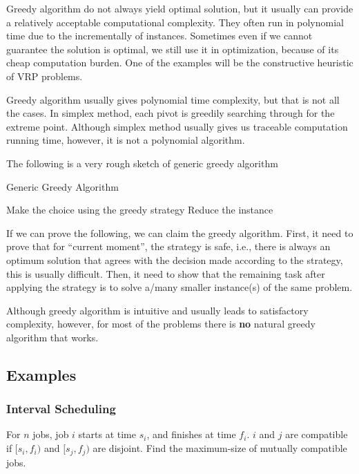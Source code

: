 					Greedy algorithm do not always yield optimal solution, but it usually can provide a relatively acceptable computational complexity. They often run in polynomial time due to the incrementally of instances. Sometimes even if we cannot guarantee the solution is optimal, we still use it in optimization, because of its cheap computation burden. One of the examples will be the constructive heuristic of VRP problems.

					Greedy algorithm usually gives polynomial time complexity, but that is not all the cases. In simplex method, each pivot is greedily searching through for the extreme point. Although simplex method usually gives us traceable computation running time, however, it is not a polynomial algorithm.

					The following is a very rough sketch of generic greedy algorithm
					\begin{algorithm}[!ht]
						\caption{Generic Greedy Algorithm}
						\begin{algorithmic}[1]
								\State Make the choice using the greedy strategy
								\State Reduce the instance
							\EndWhile
						\end{algorithmic}
					\end{algorithm}

					If we can prove the following, we can claim the greedy algorithm. First, it need to prove that for ``current moment'', the strategy is safe, i.e., there is always an optimum solution that agrees with the decision made according to the strategy, this is usually difficult. Then, it need to show that the remaining task after applying the strategy is to solve a/many smaller instance(s) of the same problem.

					Although greedy algorithm is intuitive and usually leads to satisfactory complexity, however, for most of the problems there is \textbf{no} natural greedy algorithm that works.
				\subsection{Examples}
					\subsubsection{Interval Scheduling}
						For $n$ jobs, job $i$ starts at time $s_i$, and finishes at time $f_i$. $i$ and $j$ are compatible if $[s_i, f_i)$ and $[s_j, f_j)$ are disjoint. Find the maximum-size of mutually compatible jobs.

